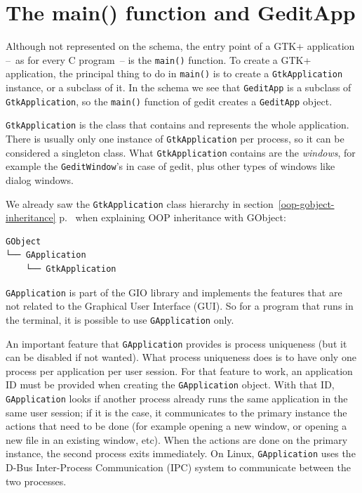 \section{The main() function and GeditApp}

Although not represented on the schema, the entry point of a GTK+ application --~as for every C program~-- is the \lstinline{main()} function. To create a GTK+ application, the principal thing to do in \lstinline{main()} is to create a \lstinline{GtkApplication} instance, or a subclass of it. In the schema we see that \lstinline{GeditApp} is a subclass of \lstinline{GtkApplication}, so the \lstinline{main()} function of gedit creates a \lstinline{GeditApp} object.

\lstinline{GtkApplication} is the class that contains and represents the whole application. There is usually only one instance of \lstinline{GtkApplication} per process, so it can be considered a singleton class. What \lstinline{GtkApplication} contains are the \emph{windows}, for example the \lstinline{GeditWindow}'s in case of gedit, plus other types of windows like dialog windows.

We already saw the \lstinline{GtkApplication} class hierarchy in section~\ref{oop-gobject-inheritance} p.~\pageref{oop-gobject-inheritance} when explaining OOP inheritance with GObject:

\begin{verbatim}
GObject
└── GApplication
    └── GtkApplication
\end{verbatim}

\lstinline{GApplication} is part of the GIO library and implements the features that are not related to the Graphical User Interface (GUI). So for a program that runs in the terminal, it is possible to use \lstinline{GApplication} only.

An important feature that \lstinline{GApplication} provides is process uniqueness (but it can be disabled if not wanted). What process uniqueness does is to have only one process per application per user session. For that feature to work, an application ID must be provided when creating the \lstinline{GApplication} object. With that ID, \lstinline{GApplication} looks if another process already runs the same application in the same user session; if it is the case, it communicates to the primary instance the actions that need to be done (for example opening a new window, or opening a new file in an existing window, etc). When the actions are done on the primary instance, the second process exits immediately. On Linux, \lstinline{GApplication} uses the D-Bus Inter-Process Communication (IPC) system to communicate between the two processes.

